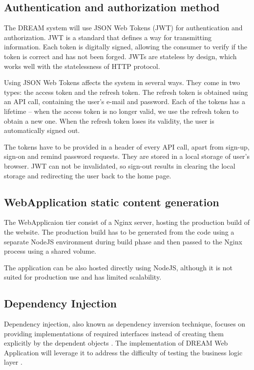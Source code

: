 \subsection{Authentication and authorization method}
The DREAM system will use JSON Web Tokens (JWT) \cite{jwt} for authentication and authorization. JWT is a standard that defines a way for transmitting information. Each token is digitally signed, allowing the consumer to verify if the token is correct and has not been forged. JWTs are stateless by design, which works well with the statelessness of HTTP protocol. 

Using JSON Web Tokens affects the system in several ways. They come in two types: the access token and the refresh token. The refresh token is obtained using an API call, containing the user's e-mail and password. Each of the tokens has a lifetime – when the access token is no longer valid, we use the refresh token to obtain a new one. When the refresh token loses its validity, the user is automatically signed out.

The tokens have to be provided in a header of every API call, apart from sign-up, sign-on and remind password requests. They are stored in a local storage of user's browser. JWT can not be invalidated, so sign-out results in clearing the local storage and redirecting the user back to the home page.

\subsection{WebApplication static content generation}
The WebApplicaion tier consist of a Nginx server, hosting the production build of the website. The production build has to be generated from the code using a separate NodeJS environment during build phase and then passed to the Nginx process using a shared volume.

The application can be also hosted directly using NodeJS, although it is not suited for production use and has limited scalability.

\subsection{Dependency Injection}
Dependency injection, also known as dependency inversion technique, focuses on providing implementations of required interfaces instead of creating them explicitly by the dependent objects \cite{di}. The implementation of DREAM Web Application will leverage it to address the difficulty of testing the business logic layer \cites{ntier}.
